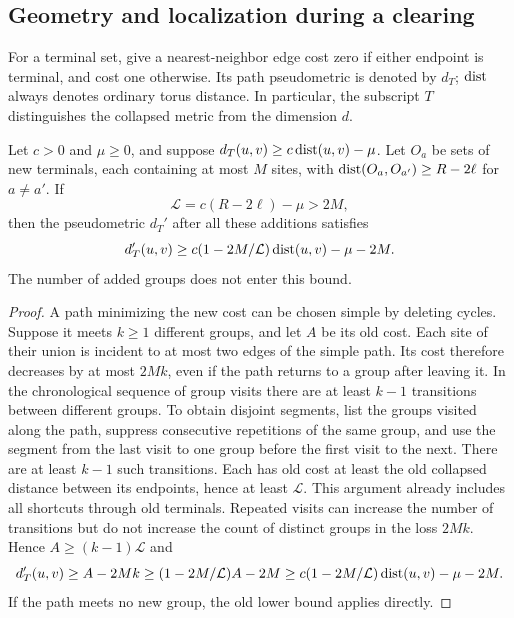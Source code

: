 \subsection{Geometry and localization during a clearing}

For a terminal set, give a nearest-neighbor edge cost zero if either
endpoint is terminal, and cost one otherwise. Its path pseudometric is
denoted by $d_T$; $\operatorname{dist}$ always denotes ordinary torus distance.
In particular, the subscript $T$ distinguishes the collapsed metric
from the dimension $d$.

\begin{lemma}
\label{lem:assembly-metric}
Let $c>0$ and $\mu\ge0$, and suppose
$d_T(u,v)\ge c\operatorname{dist}(u,v)-\mu$. Let $O_a$ be sets of new terminals,
each containing at most $M$ sites, with
$\operatorname{dist}(O_a,O_{a'})\ge R-2\ell$ for $a\ne a'$. If
\[
 \mathcal L=c(R-2\ell)-\mu>2M,
\]
then the pseudometric $d_T'$ after all these additions satisfies
\[
 d_T'(u,v)\ge c(1-2M/\mathcal L)\operatorname{dist}(u,v)-\mu-2M.
\]
The number of added groups does not enter this bound.
\end{lemma}

\begin{proof}
A path minimizing the new cost can be chosen simple by deleting cycles.
Suppose it meets $k\ge1$ different groups, and let $A$ be its old cost.
Each site of their union is incident to at most two edges of the simple
path. Its cost therefore decreases by at most $2Mk$, even if the path
returns to a group after leaving it. In the chronological sequence of
group visits there are at least $k-1$ transitions between different
groups. To obtain disjoint segments, list the groups visited along the
path, suppress consecutive repetitions of the same group, and use the
segment from the last visit to one group before the first visit to the
next. There are at least $k-1$ such transitions. Each has old cost at
least the old collapsed distance between its endpoints, hence at least
$\mathcal L$. This argument already includes all shortcuts through
old terminals. Repeated visits can increase the number of transitions
but do not increase the count of distinct groups in the loss $2Mk$.
Hence $A\ge(k-1)\mathcal L$ and
\[
 d_T'(u,v)\ge A-2Mk
 \ge (1-2M/\mathcal L)A-2M
 \ge c(1-2M/\mathcal L)\operatorname{dist}(u,v)-\mu-2M.
\]
If the path meets no new group, the old lower bound applies directly.
\end{proof}

